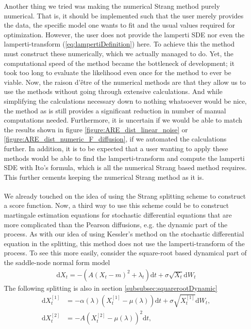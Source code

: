 Another thing we tried was making the numerical Strang method purely numerical. That is, it should be implemented such that the user merely provides the data, the specific model one wants to fit and the usual values required for optimization. However, the user does not provide the lamperti SDE nor even the lamperti-transform (\ref{eq:lampertiDefinition}) here. To achieve this the method must construct these numerically, which we actually managed to do. Yet, the computational speed of the method became the bottleneck of development; it took too long to evaluate the likelihood even once for the method to ever be viable. Now, the raison d'être of the numerical methods are that they allow us to use the methods without going through extensive calculations. And while simplifying the calculations necessary down to nothing whatsoever would be nice, the method as is still provides a significant reduction in number of manual computations needed. Furthermore, it is uncertain if we would be able to match the results shown in figure \ref{figure:ARE_dist_linear_noise} or \ref{figure:ARE_dist_numeric_F_diffusion}, if we automated the calculations further. In addition, it is to be expected that a user wanting to apply these methods would be able to find the lamperti-transform and compute the lamperti SDE with Ito's formula, which is all the numerical Strang based method requires. This further cements keeping the numerical Strang method as it is. \\\\
We already touched on the idea of using the Strang splitting scheme to construct a score function. Now, a third way to use this scheme could be to construct martingale estimation equations for stochastic differential equations that are more complicated than the Pearson diffusions, e.g. the dynamic part of the process. As with our idea of using Kessler's method on the stochastic differential equation in the splitting, this method does not use the lamperti-transform of the process. To see this more easily, consider the square-root based dynamical part of the saddle-node normal form model
\begin{align}
    \mathrm{d}X_t = -(A(X_t - m)^2 + \lambda_t)\mathrm{d}t + \sigma\sqrt{X_t}\mathrm{d}W_t
\end{align}  
The following splitting is also in section \ref{subsubsec:squarerootDynamic}
\begin{align}
    \mathrm{d}X_t^{[1]} &= -\alpha(\lambda)\left(X_t^{[1]} - \mu(\lambda)\right)  \mathrm{d}t + \sigma \sqrt{X_t^{[1]}} \mathrm{d}W_t, \label{eq:squareRootSplit1_discussion} \\
    \mathrm{d}X_t^{[2]} &= - A \left(X_t^{[2]} - \mu(\lambda)\right)^2 \mathrm{d}t, \label{eq:squareRootSplit2_discussion}
\end{align}
